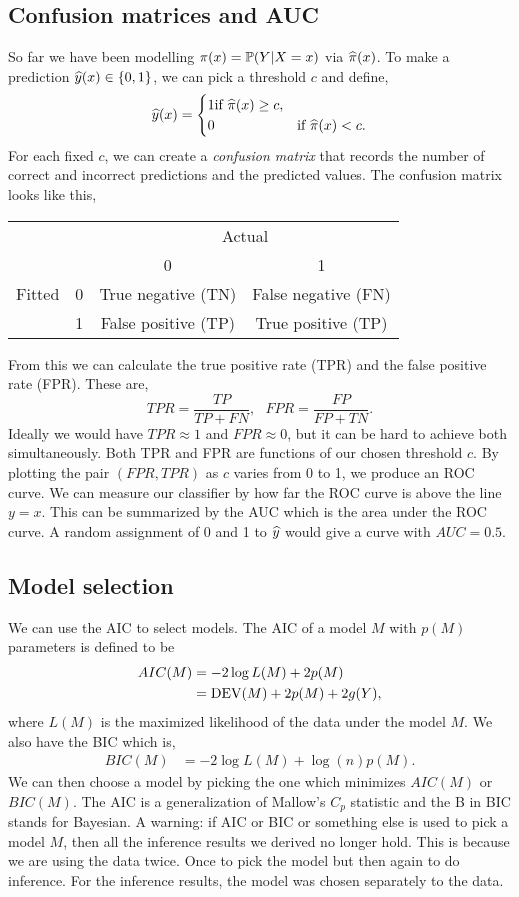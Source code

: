 \subsection{Confusion  matrices  and  AUC}
So  far we have been modelling $\pi(x) = {\mathbb{P}}(Y|X=x)$  via $\widehat{\pi}(x)$. To make a prediction $\widehat{y}(x)  \in \{0,1\}$, we  can pick a  threshold  $c$ and  define,
\[\widehat{y}(x) = \begin{cases}
    1 \text{if } \widehat{\pi}(x) \ge c,\\
    0 & \text{if }  \widehat{\pi}(x) < c.
\end{cases}  \]
For each  fixed   $c$, we  can  create  a  \emph{confusion  matrix} that  records the number  of  correct  and incorrect predictions  and  the predicted values. The  confusion matrix looks  like this,
\begin{center}
    \begin{tabular}{cc|cc}
        &&\multicolumn{2}{c}{Actual}\\
        &&0&1\\
        \hline 
        Fitted&0&True   negative (TN)&False negative  (FN)\\
                &1&  False positive (TP)& True  positive (TP)
    \end{tabular}
\end{center}
From this we  can calculate the  true positive  rate (TPR)  and the false positive rate (FPR). These are,
\[TPR  = \frac{TP}{TP+FN},~~~FPR  = \frac{FP}{FP+TN}.\]
Ideally  we  would  have $TPR  \approx  1$  and $FPR  \approx  0$, but it can be hard to  achieve both simultaneously. Both TPR and FPR  are functions  of our chosen threshold  $c$. By plotting  the pair  $(FPR,TPR)$ as $c$  varies  from  0 to  1, we produce an ROC curve. We can  measure  our  classifier by how far the ROC curve is above  the line $y=x$. This can be summarized by the  AUC which is the area under the ROC curve. A random assignment of 0  and  1 to $\widehat{y}$ would give a curve with $AUC = 0.5$.

\subsection{Model selection}
We can use the AIC to select models. The AIC of a model $M$ with $p(M)$ parameters is defined to be
\begin{align*}
    AIC(M) &=-2\log L(M)+2p(M)\\
&=\operatorname{DEV}(M)+2p(M)+2g(Y),
\end{align*}
where $L(M)$ is the maximized likelihood of the data under the model $M$. We also have the BIC which is,
\begin{align*}
    BIC(M) &=-2\log L(M)+\log(n)p(M).
\end{align*}
We can then choose a model by picking the one which minimizes $AIC(M)$ or $BIC(M)$. The AIC is a generalization of Mallow's $C_p$ statistic and the B in BIC stands for Bayesian. A warning: if AIC or BIC or something else is used to pick a model $M$, then all the inference results we derived no longer hold. This is because we are using the data  twice. Once to pick the model but then again to do inference. For the inference results, the model was chosen separately to the data. 
